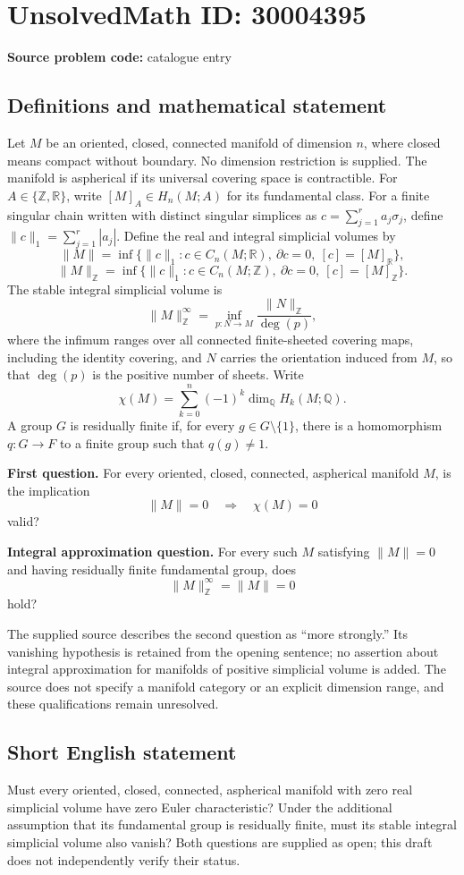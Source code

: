 \documentclass[11pt]{article}
\newcommand{\Z}{\mathbb{Z}}
\newcommand{\Q}{\mathbb{Q}}
\newcommand{\R}{\mathbb{R}}
\begin{document}
\section*{UnsolvedMath ID: 30004395}
\textbf{Source problem code:} catalogue entry
\subsection{Definitions and mathematical statement}
Let \(M\) be an oriented, closed, connected manifold of dimension \(n\), where closed means compact without boundary. No dimension restriction is supplied. The manifold is aspherical if its universal covering space is contractible. For \(A\in\{\Z,\R\}\), write \([M]_A\in H_n(M;A)\) for its fundamental class. For a finite singular chain written with distinct singular simplices as \(c=\sum_{j=1}^r a_j\sigma_j\), define \(\lVert c\rVert_1=\sum_{j=1}^r|a_j|\). Define the real and integral simplicial volumes by
\[
\lVert M\rVert=\inf\{\lVert c\rVert_1:c\in C_n(M;\R),\ \partial c=0,\ [c]=[M]_{\R}\},
\]
\[
\lVert M\rVert_{\Z}=\inf\{\lVert c\rVert_1:c\in C_n(M;\Z),\ \partial c=0,\ [c]=[M]_{\Z}\}.
\]
The stable integral simplicial volume is
\[
\lVert M\rVert_{\Z}^{\infty}
=\inf_{p:N\to M}\frac{\lVert N\rVert_{\Z}}{\deg(p)},
\]
where the infimum ranges over all connected finite-sheeted covering maps, including the identity covering, and \(N\) carries the orientation induced from \(M\), so that \(\deg(p)\) is the positive number of sheets. Write
\[
\chi(M)=\sum_{k=0}^{n}(-1)^k\dim_{\Q}H_k(M;\Q).
\]
A group \(G\) is residually finite if, for every \(g\in G\setminus\{1\}\), there is a homomorphism \(q:G\to F\) to a finite group such that \(q(g)\ne1\).

\textbf{First question.} For every oriented, closed, connected, aspherical manifold \(M\), is the implication
\[
\lVert M\rVert=0\quad\Longrightarrow\quad\chi(M)=0
\]
valid?

\textbf{Integral approximation question.} For every such \(M\) satisfying \(\lVert M\rVert=0\) and having residually finite fundamental group, does
\[
\lVert M\rVert_{\Z}^{\infty}=\lVert M\rVert=0
\]
hold?

The supplied source describes the second question as ``more strongly.'' Its vanishing hypothesis is retained from the opening sentence; no assertion about integral approximation for manifolds of positive simplicial volume is added. The source does not specify a manifold category or an explicit dimension range, and these qualifications remain unresolved.
\subsection{Short English statement}
Must every oriented, closed, connected, aspherical manifold with zero real simplicial volume have zero Euler characteristic? Under the additional assumption that its fundamental group is residually finite, must its stable integral simplicial volume also vanish? Both questions are supplied as open; this draft does not independently verify their status.
\end{document}
